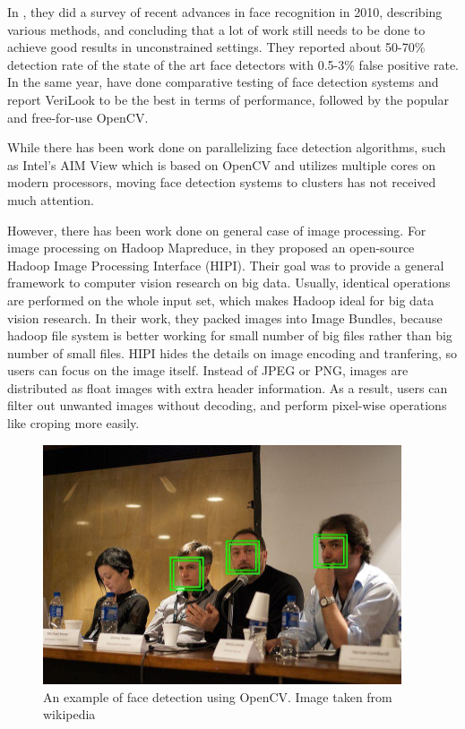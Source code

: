 \documentclass[11pt, draftclsnofoot, onecolumn]{IEEEtran}
\begin{document}
In \cite{MSR2010}, they did a survey of recent advances in face recognition in 2010, describing various methods, and concluding that a lot of work still needs to be done to achieve good results in unconstrained settings. They reported about 50-70\% detection rate of the state of the art face detectors with 0.5-3\% false positive rate. In the same year, \cite{TSU2010} have done comparative testing of face detection systems and report VeriLook to be the best in terms of performance, followed by the popular and free-for-use OpenCV.

While there has been work done on parallelizing face detection algorithms, such as Intel's AIM View \cite{IC2012} which is based on OpenCV and utilizes multiple cores on modern processors, moving face detection systems to clusters has not received much attention. 

However, there has been work done on general case of image processing. For image processing on Hadoop Mapreduce, in \cite{sweeney2011hipi} they proposed an open-source Hadoop Image Processing Interface (HIPI). Their goal was to provide a general framework to computer vision research on big data. Usually, identical operations are performed on the whole input set, which makes Hadoop ideal for big data vision research. In their work, they packed images into Image Bundles, because hadoop file system is better working for small number of big files rather than big number of small files\cite{sweeney2011hipi}. HIPI hides the details on image encoding and tranfering, so users can focus on the image itself. Instead of JPEG or PNG, images are distributed as float images with extra header information. As a result, users can filter out unwanted images without decoding, and perform pixel-wise operations like croping more easily. 

\begin{figure}[t]
\centering
\includegraphics[width=300pt]{img2}
\caption{An example of face detection using OpenCV. Image taken from wikipedia \cite{wikiImage}}
\end{figure}
\end{document}
